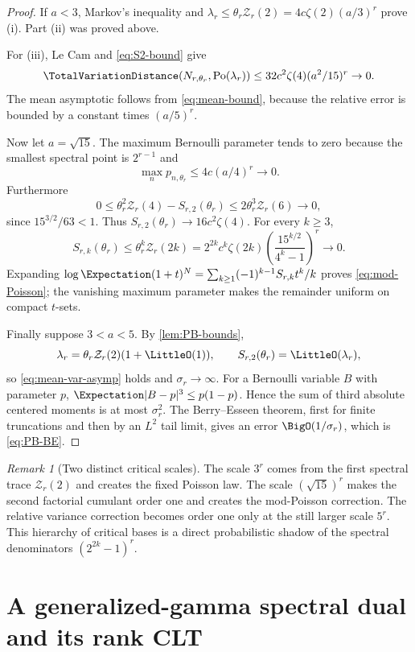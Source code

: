 \documentclass[11pt,oneside]{article}
\theoremstyle{definition}
\theoremstyle{remark}
\newtheorem{remark}[theorem]{Remark}
\newcommand{\Po}{\operatorname{Po}}
\newcommand{\ZetaR}{\mathcal Z}
\begin{document}
\begin{proof}
If $a<3$, Markov's inequality and
$\lambda_r\leq\theta_r\ZetaR_r(2)=4c\zeta(2)(a/3)^r$ prove (i).
Part (ii) was proved above.

For (iii), Le Cam and \eqref{eq:S2-bound} give
\[
 \TotalVariationDistance(N_{r,\theta_r},\Po(\lambda_r))
 \leq32c^2\zeta(4)(a^2/15)^r\to0.
\]
The mean asymptotic follows from
\eqref{eq:mean-bound}, because the relative error is bounded by a constant
times $(a/5)^r$.

Now let $a=\sqrt{15}$.  The maximum Bernoulli parameter tends to zero because
the smallest spectral point is $2^{r-1}$ and
\[
 \max_np_{n,\theta_r}\leq4c(a/4)^r\to0.
\]
Furthermore
\[
 0\leq\theta_r^2\ZetaR_r(4)-S_{r,2}(\theta_r)
 \leq2\theta_r^3\ZetaR_r(6)\to0,
\]
since $15^{3/2}/63<1$.  Thus
$S_{r,2}(\theta_r)\to16c^2\zeta(4)$.  For every $k\geq3$,
\[
 S_{r,k}(\theta_r)\leq\theta_r^k\ZetaR_r(2k)
 =2^{2k}c^k\zeta(2k)
 \left(\frac{15^{k/2}}{4^k-1}\right)^r\to0.
\]
Expanding
$\log\Expectation(1+t)^N=\sum_{k\geq1}(-1)^{k-1}S_{r,k}t^k/k$ proves
\eqref{eq:mod-Poisson}; the vanishing maximum parameter makes the remainder
uniform on compact $t$-sets.

Finally suppose $3<a<5$.  By \cref{lem:PB-bounds},
\[
 \lambda_r=\theta_r\ZetaR_r(2)(1+\LittleO(1)),\qquad
 S_{r,2}(\theta_r)=\LittleO(\lambda_r),
\]
so \eqref{eq:mean-var-asymp} holds and $\sigma_r\to\infty$.  For a Bernoulli
variable $B$ with parameter $p$,
$\Expectation|B-p|^3\leq p(1-p)$.  Hence the sum of third absolute centered moments is
at most $\sigma_r^2$.  The Berry--Esseen theorem, first for finite truncations
and then by an $L^2$ tail limit, gives an error $\BigO(1/\sigma_r)$, which is
\eqref{eq:PB-BE}.
\end{proof}

\begin{remark}[Two distinct critical scales]
The scale $3^r$ comes from the first spectral trace $\ZetaR_r(2)$ and creates
the fixed Poisson law.  The scale $(\sqrt{15})^r$ makes the second factorial
cumulant order one and creates the mod-Poisson correction.  The relative
variance correction becomes order one only at the still larger scale $5^r$.
This hierarchy of critical bases is a direct probabilistic shadow of the
spectral denominators $(2^{2k}-1)^r$.
\end{remark}

\section{A generalized-gamma spectral dual and its rank CLT}
\end{document}
